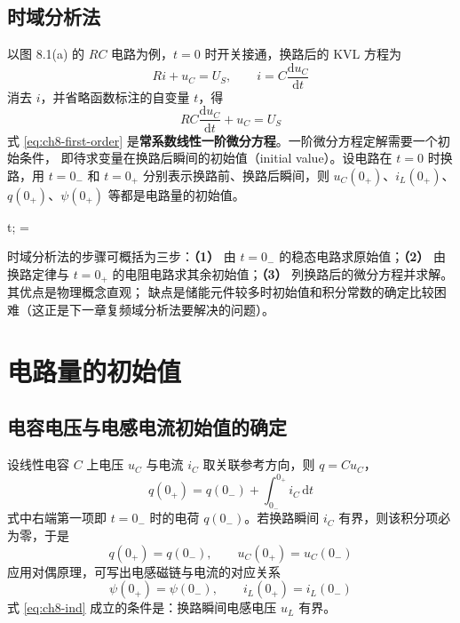 \subsection{时域分析法}
以图 8.1(a) 的 $RC$ 电路为例，$t=0$ 时开关接通，换路后的 KVL 方程为
\begin{equation}
  Ri+u_C=U_S,\qquad i=C\frac{\mathrm{d}u_C}{\mathrm{d}t}
\end{equation}
消去 $i$，并省略函数标注的自变量 $t$，得
\begin{equation}
  RC\frac{\mathrm{d}u_C}{\mathrm{d}t}+u_C=U_S
  \label{eq:ch8-first-order}
\end{equation}
式 \eqref{eq:ch8-first-order} 是\textbf{常系数线性一阶微分方程}。一阶微分方程定解需要一个初始条件，
即待求变量在换路后瞬间的初始值（initial value）。设电路在 $t=0$ 时换路，用 $t=0_-$ 和 $t=0_+$
分别表示换路前、换路后瞬间，则 $u_C(0_+)$、$i_L(0_+)$、$q(0_+)$、$\psi(0_+)$ 等都是电路量的初始值。

\begin{keyformula}{%
  t;\qquad
  =}
\end{keyformula}

时域分析法的步骤可概括为三步：\textbf{（1）} 由 $t=0_-$ 的稳态电路求原始值；\textbf{（2）} 由换路定律与
$t=0_+$ 的电阻电路求其余初始值；\textbf{（3）} 列换路后的微分方程并求解。其优点是物理概念直观；
缺点是储能元件较多时初始值和积分常数的确定比较困难（这正是下一章复频域分析法要解决的问题）。

\section{电路量的初始值}

\subsection{电容电压与电感电流初始值的确定}
设线性电容 $C$ 上电压 $u_C$ 与电流 $i_C$ 取关联参考方向，则 $q=Cu_C$，
\begin{equation}
  q(0_+)=q(0_-)+\int_{0_-}^{0_+}i_C\,\mathrm{d}t
\end{equation}
式中右端第一项即 $t=0_-$ 时的电荷 $q(0_-)$。若换路瞬间 $i_C$ 有界，则该积分项必为零，于是
\begin{equation}
  q(0_+)=q(0_-),\qquad u_C(0_+)=u_C(0_-)
  \label{eq:ch8-cap}
\end{equation}
应用对偶原理，可写出电感磁链与电流的对应关系
\begin{equation}
  \psi(0_+)=\psi(0_-),\qquad i_L(0_+)=i_L(0_-)
  \label{eq:ch8-ind}
\end{equation}
式 \eqref{eq:ch8-ind} 成立的条件是：换路瞬间电感电压 $u_L$ 有界。

